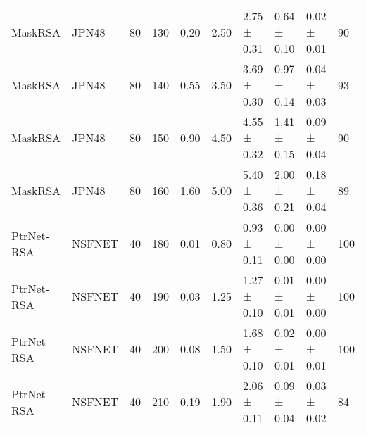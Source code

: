 \begin{longtable}[!htbp]{llll|lllll|l}
MaskRSA              & JPN48             & 80                   & 130                                                               & 0.20  & \multicolumn{1}{l|}{2.50}     & 2.75 ± 0.31 & 0.64 ± 0.10      & 0.02 ± 0.01                  & 90                                                                                    \\
MaskRSA              & JPN48             & 80                   & 140                                                               & 0.55 & \multicolumn{1}{l|}{3.50}     & 3.69 ± 0.30 & 0.97 ± 0.14      & 0.04 ± 0.03                  & 93 \\
MaskRSA              & JPN48             & 80                   & 150                                                               & 0.90  & \multicolumn{1}{l|}{4.50}     & 4.55 ± 0.32 & 1.41 ± 0.15      & 0.09 ± 0.04                  & 90                                                                                    \\
MaskRSA              & JPN48             & 80                   & 160                                                               & 1.60  & \multicolumn{1}{l|}{5.00}       & 5.40 ± 0.36 & 2.00 ± 0.21      & 0.18 ± 0.04                  & 89                                                                                    \\
PtrNet-RSA           & NSFNET            & 40                   & 180                                                               & 0.01 & \multicolumn{1}{l|}{0.80}     & 0.93 ± 0.11 & 0.00 ± 0.00      & 0.00 ± 0.00                  & 100                                                                                    \\
PtrNet-RSA           & NSFNET            & 40                   & 190                                                               & 0.03 & \multicolumn{1}{l|}{1.25}    & 1.27 ± 0.10 & 0.01 ± 0.01      & 0.00 ± 0.00                  & 100                                                                                    \\
PtrNet-RSA           & NSFNET            & 40                   & 200                                                               & 0.08 & \multicolumn{1}{l|}{1.50}     & 1.68 ± 0.10 & 0.02 ± 0.01      & 0.00 ± 0.01                  & 100                                                                                    \\
PtrNet-RSA           & NSFNET            & 40                   & 210                                                               & 0.19 & \multicolumn{1}{l|}{1.90}     & 2.06 ± 0.11 & 0.09 ± 0.04      & 0.03 ± 0.02                  & 84                                                                                    \\

\end{longtable}
